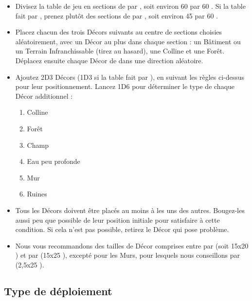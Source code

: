 \begin{itemize}[label={\textbullet}]
\item Divisez la table de jeu en sections de  par , soit environ 60 {\centi\meter} par 60 {\centi\meter}. Si la table fait  par , prenez plutôt des sections de  par , soit environ 45 {\centi\meter} par 60 {\centi\meter}.

\item Placez chacun des trois Décors suivants au centre de sections choisies aléatoirement, avec un Décor au plus dans chaque section : un Bâtiment ou un Terrain Infranchissable (tirez au hasard), une Colline et une Forêt. Déplacez ensuite chaque Décor de  dans une direction aléatoire.

\item Ajoutez 2D3 Décors (1D3 si la table fait  par ), en suivant les règles ci-dessus pour leur positionnement. Lancez 1D6 pour déterminer le type de chaque Décor additionnel :
\begin{enumerate}
\item Colline
\item Forêt
\item Champ
\item Eau peu profonde
\item Mur
\item Ruines
\end{enumerate}

\item Tous les Décors doivent être placés au moins à  les uns des autres. Bougez-les aussi peu que possible de leur position initiale pour satisfaire à cette condition. Si cela n'est pas possible, retirez le Décor qui pose problème.

\item Nous vous recommandons des tailles de Décor comprises entre  par  (soit 15x20 {\centi\meter}) et  par  (15x25 {\centi\meter}), excepté pour les Murs, pour lesquels nous conseillons  par  (2,5x25 {\centi\meter}).
\end{itemize}

\newpage
\subsection{Type de déploiement}

